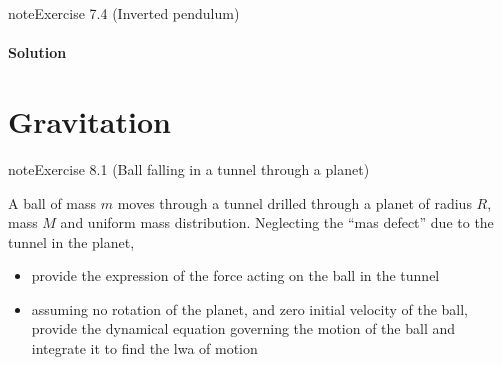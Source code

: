 \documentclass[letterpaper,10pt,english]{jupyterBook}
\begin{document}
 \label{exercise:ch/exercises-dynamics-exercise-3}

\begin{sphinxadmonition}{note}{Exercise 7.4 (Inverted pendulum)}


\end{sphinxadmonition}
\subsubsection*{Solution}

\sphinxstepscope


\chapter{Gravitation}
\label{\detokenize{ch/exercises-gravitation:gravitation}}\label{\detokenize{ch/exercises-gravitation:classical-mechanics-exercise-gravitation}}\label{\detokenize{ch/exercises-gravitation::doc}} \label{exercise:ch/exercises-gravitation-exercise-0}

\begin{sphinxadmonition}{note}{Exercise 8.1 (Ball falling in a tunnel through a planet)}



\sphinxAtStartPar
A ball of mass \(m\) moves through a tunnel drilled through a planet of radius \(R\), mass \(M\) and uniform mass distribution. Neglecting the “mas defect” due to the tunnel in the planet,
\begin{itemize}
\item {} 
\sphinxAtStartPar
provide the expression of the force acting on the ball in the tunnel

\item {} 
\sphinxAtStartPar
assuming no rotation of the planet, and zero initial velocity of the ball, provide the dynamical equation governing the motion of the ball and integrate it to find the lwa of motion

\end{itemize}
\end{sphinxadmonition}
\end{document}
